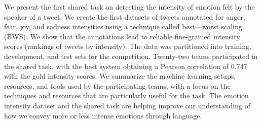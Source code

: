 We present the first shared task on detecting the intensity of emotion felt by the speaker of a tweet. We create the first datasets of tweets annotated for anger, fear, joy, and sadness intensities using a technique called best---worst scaling (BWS). We show that the annotations lead to reliable fine-grained intensity scores (rankings of tweets by intensity). The data was partitioned into training, development, and test sets for the competition. Twenty-two teams participated in the shared task, with the best system obtaining a Pearson correlation of 0.747 with the gold intensity scores. We summarize the machine learning setups, resources, and tools used by the participating teams, with a focus on the techniques and resources that are particularly useful for the task. The emotion intensity dataset and the shared task are helping improve our understanding of how we convey more or less intense emotions through language.
